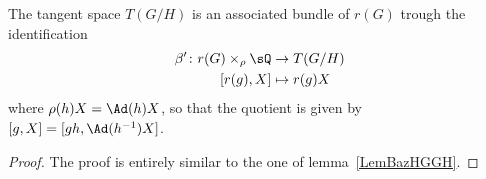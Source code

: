 \begin{lemma}
	The tangent space $T(G/H)$ is an associated bundle of $r(G)$ trough the identification
	\begin{equation}
		\begin{aligned}
			\beta'\colon r(G)\times_{\rho}\sQ & \to T(G/H)    \\
			[r(g),X]                          & \mapsto r(g)X
		\end{aligned}
	\end{equation}
	where $\rho(h)X=\Ad(h)X$, so that the quotient is given by $[g,X]=[gh,\Ad(h^{-1})X]$.
\end{lemma}

\begin{proof}
	The proof is entirely similar to the one of lemma~\ref{LemBazHGGH}.
\end{proof}
